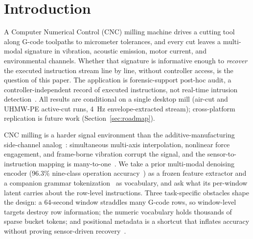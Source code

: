 \documentclass[conference]{IEEEtran}
\begin{document}
\section{Introduction}
\label{sec:introduction}

A Computer Numerical Control (CNC) milling machine drives a cutting tool along G-code toolpaths to micrometer tolerances, and every cut leaves a multi-modal signature in vibration, acoustic emission, motor current, and environmental channels. Whether that signature is informative enough to \emph{recover} the executed instruction stream line by line, without controller access, is the question of this paper. The application is forensic-support post-hoc audit, a controller-independent record of executed instructions, not real-time intrusion detection~\cite{nist2023sp80082,sturm2014cyber,yampolskiy2018security,kimmell2025cnc}. All results are conditional on a single desktop mill (air-cut and UHMW-PE active-cut runs, 4~Hz envelope-extracted stream); cross-platform replication is future work (Section~\ref{sec:roadmap}).

CNC milling is a harder signal environment than the additive-manufacturing side-channel analog~\cite{alfaruque2016acoustic,song2016my,chhetri2016kcad}: simultaneous multi-axis interpolation, nonlinear force engagement, and frame-borne vibration corrupt the signal, and the sensor-to-instruction mapping is many-to-one~\cite{teti2010advanced,wang2018deep}. We take a prior multi-modal denoising encoder (96.3\% nine-class operation accuracy~\cite{encoder_paper}) as a frozen feature extractor and a companion grammar tokenization~\cite{grammar_paper} as vocabulary, and ask what its per-window latent carries about the row-level instructions. Three task-specific obstacles shape the design: a 64-second window straddles many G-code rows, so window-level targets destroy row information; the numeric vocabulary holds thousands of sparse bucket tokens; and positional metadata is a shortcut that inflates accuracy without proving sensor-driven recovery~\cite{meyes2019ablation}.
\end{document}
